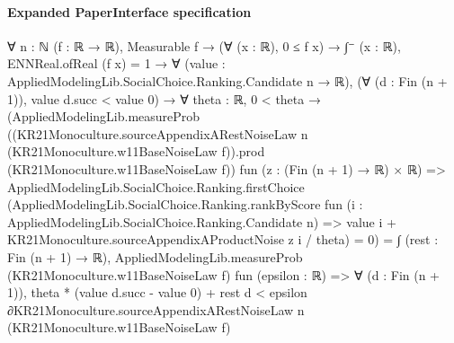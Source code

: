\documentclass[10pt]{article}
\begin{document}
\paragraph{Expanded PaperInterface specification}
\begin{ReviewVerbatim}
∀ {n : ℕ} (f : ℝ → ℝ),
  Measurable f →
    (∀ (x : ℝ), 0 ≤ f x) →
      ∫⁻ (x : ℝ), ENNReal.ofReal (f x) = 1 →
        ∀ (value : AppliedModelingLib.SocialChoice.Ranking.Candidate n → ℝ),
          (∀ (d : Fin (n + 1)), value d.succ < value 0) →
            ∀ {theta : ℝ},
              0 < theta →
                (AppliedModelingLib.measureProb
                    ((KR21Monoculture.sourceAppendixARestNoiseLaw n (KR21Monoculture.w11BaseNoiseLaw f)).prod
                      (KR21Monoculture.w11BaseNoiseLaw f))
                    fun (z : (Fin (n + 1) → ℝ) × ℝ) =>
                    AppliedModelingLib.SocialChoice.Ranking.firstChoice
                        (AppliedModelingLib.SocialChoice.Ranking.rankByScore
                          fun (i : AppliedModelingLib.SocialChoice.Ranking.Candidate n) =>
                          value i + KR21Monoculture.sourceAppendixAProductNoise z i / theta) =
                      0) =
                  ∫ (rest : Fin (n + 1) → ℝ),
                    AppliedModelingLib.measureProb (KR21Monoculture.w11BaseNoiseLaw f) fun (epsilon : ℝ) =>
                      ∀ (d : Fin (n + 1)),
                        theta * (value d.succ - value 0) + rest d <
                          epsilon ∂KR21Monoculture.sourceAppendixARestNoiseLaw n (KR21Monoculture.w11BaseNoiseLaw f)
\end{ReviewVerbatim}
\end{document}
